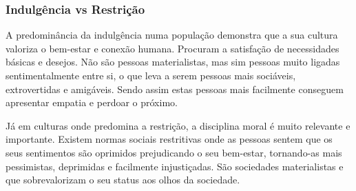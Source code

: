 \subsubsection{Indulgência vs Restrição}

A predominância da indulgência numa população demonstra que a sua cultura valoriza o bem-estar e conexão humana. Procuram a satisfação de necessidades básicas e desejos. Não são pessoas materialistas, mas sim pessoas muito ligadas sentimentalmente entre si, o que leva a serem pessoas mais sociáveis, extrovertidas e amigáveis. Sendo assim estas pessoas mais facilmente conseguem apresentar empatia e perdoar o próximo.

Já em culturas onde predomina a restrição, a disciplina moral é muito relevante e importante. Existem normas sociais restritivas onde as pessoas sentem que os seus sentimentos são oprimidos prejudicando o seu bem-estar, tornando-as mais pessimistas, deprimidas e facilmente injustiçadas. São sociedades materialistas e que sobrevalorizam o seu status aos olhos da sociedade.